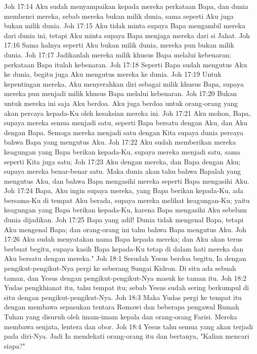 Joh 17:14  Aku sudah menyampaikan kepada mereka perkataan Bapa, dan dunia membenci mereka, sebab mereka bukan milik dunia, sama seperti Aku juga bukan milik dunia.
Joh 17:15  Aku tidak minta supaya Bapa mengambil mereka dari dunia ini, tetapi Aku minta supaya Bapa menjaga mereka dari si Jahat.
Joh 17:16  Sama halnya seperti Aku bukan milik dunia, mereka pun bukan milik dunia.
Joh 17:17  Jadikanlah mereka milik khusus Bapa melalui kebenaran; perkataan Bapa itulah kebenaran.
Joh 17:18  Seperti Bapa sudah mengutus Aku ke dunia, begitu juga Aku mengutus mereka ke dunia.
Joh 17:19  Untuk kepentingan mereka, Aku menyerahkan diri sebagai milik khusus Bapa, supaya mereka pun menjadi milik khusus Bapa melalui kebenaran.
Joh 17:20  Bukan untuk mereka ini saja Aku berdoa. Aku juga berdoa untuk orang-orang yang akan percaya kepada-Ku oleh kesaksian mereka ini.
Joh 17:21  Aku mohon, Bapa, supaya mereka semua menjadi satu, seperti Bapa bersatu dengan Aku, dan Aku dengan Bapa. Semoga mereka menjadi satu dengan Kita supaya dunia percaya bahwa Bapa yang mengutus Aku.
Joh 17:22  Aku sudah memberikan mereka keagungan yang Bapa berikan kepada-Ku, supaya mereka menjadi satu, sama seperti Kita juga satu;
Joh 17:23  Aku dengan mereka, dan Bapa dengan Aku; supaya mereka benar-benar satu. Maka dunia akan tahu bahwa Bapalah yang mengutus Aku, dan bahwa Bapa mengasihi mereka seperti Bapa mengasihi Aku.
Joh 17:24  Bapa, Aku ingin supaya mereka, yang Bapa berikan kepada-Ku, ada bersama-Ku di tempat Aku berada, supaya mereka melihat keagungan-Ku; yaitu keagungan yang Bapa berikan kepada-Ku, karena Bapa mengasihi Aku sebelum dunia dijadikan.
Joh 17:25  Bapa yang adil! Dunia tidak mengenal Bapa, tetapi Aku mengenal Bapa; dan orang-orang ini tahu bahwa Bapa mengutus Aku.
Joh 17:26  Aku sudah menyatakan nama Bapa kepada mereka; dan Aku akan terus berbuat begitu, supaya kasih Bapa kepada-Ku tetap di dalam hati mereka dan Aku bersatu dengan mereka."
Joh 18:1  Sesudah Yesus berdoa begitu, Ia dengan pengikut-pengikut-Nya pergi ke seberang Sungai Kidron. Di situ ada sebuah taman, dan Yesus dengan pengikut-pengikut-Nya masuk ke taman itu.
Joh 18:2  Yudas pengkhianat itu, tahu tempat itu; sebab Yesus sudah sering berkumpul di situ dengan pengikut-pengikut-Nya.
Joh 18:3  Maka Yudas pergi ke tempat itu dengan membawa sepasukan tentara Romawi dan beberapa pengawal Rumah Tuhan yang disuruh oleh imam-imam kepala dan orang-orang Farisi. Mereka membawa senjata, lentera dan obor.
Joh 18:4  Yesus tahu semua yang akan terjadi pada diri-Nya. Jadi Ia mendekati orang-orang itu dan bertanya, "Kalian mencari siapa?"
